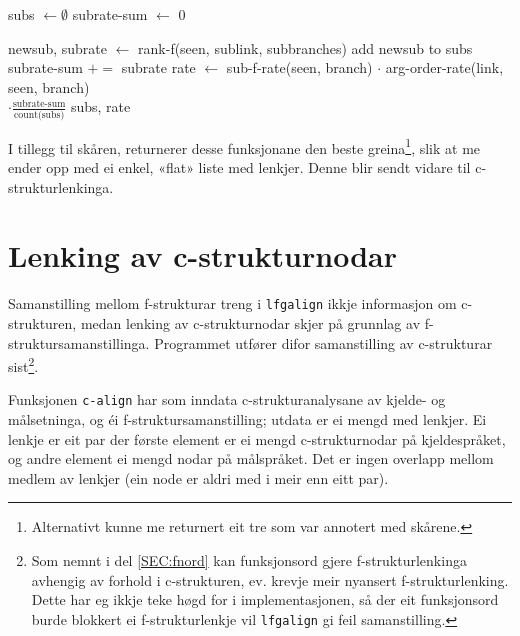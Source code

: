 \documentclass[12pt,a4paper,oneside,draft]{report}
\begin{document}
      \begin{algorithm}[htbp]
      subs $\gets \emptyset$ \;
      subrate-sum $\gets$ 0 \;
      \caption{rank-branch(seen, link, branch)}
      \label{algo:rank-branch}
         {
          newsub, subrate $\gets$ rank-f(seen, sublink, subbranches) \;
          add newsub to subs \;
          subrate-sum $+=$ subrate \;
        }
        rate $\gets$ sub-f-rate(seen, branch) $\cdot$ arg-order-rate(link, seen, branch) \\
        \hfill $\cdot \frac{\text{subrate-sum}}{\text{count(subs)}}$ \;
        \Return subs, rate \;
      \end{algorithm}

I tillegg til skåren, returnerer desse funksjonane den beste
greina\footnote{Alternativt kunne me returnert eit tre som var annotert med
        skårene. }, slik at me ender opp med ei enkel, «flat» liste med
lenkjer. Denne blir sendt vidare til c\hyp{}strukturlenkinga.


\section{Lenking av c\hyp{}strukturnodar}
\label{sec-4.3}

Samanstilling mellom f\hyp{}strukturar treng i \texttt{lfgalign} ikkje informasjon
om c\hyp{}strukturen, medan lenking av c\hyp{}strukturnodar skjer på grunnlag
av f\hyp{}struktursamanstillinga. Programmet utfører difor samanstilling av
c\hyp{}strukturar sist\footnote{Som nemnt i del \ref{SEC:fnord} kan funksjonsord gjere
       f\hyp{}strukturlenkinga avhengig av forhold i c\hyp{}strukturen,
       ev. krevje meir nyansert f\hyp{}strukturlenking. Dette har eg
       ikkje teke høgd for i implementasjonen, så der eit funksjonsord
       burde blokkert ei f\hyp{}strukturlenkje vil \texttt{lfgalign} gi feil
       samanstilling. }.

Funksjonen \texttt{c-align} har som inndata c\hyp{}strukturanalysane av kjelde- og
målsetninga, og éi f\hyp{}struktursamanstilling; utdata er ei mengd med
lenkjer. Ei lenkje er eit par der første element er ei mengd
c\hyp{}strukturnodar på kjeldespråket, og andre element ei mengd nodar på
målspråket. Det er ingen overlapp mellom medlem av lenkjer (ein node
er aldri med i meir enn eitt par).
\end{document}

